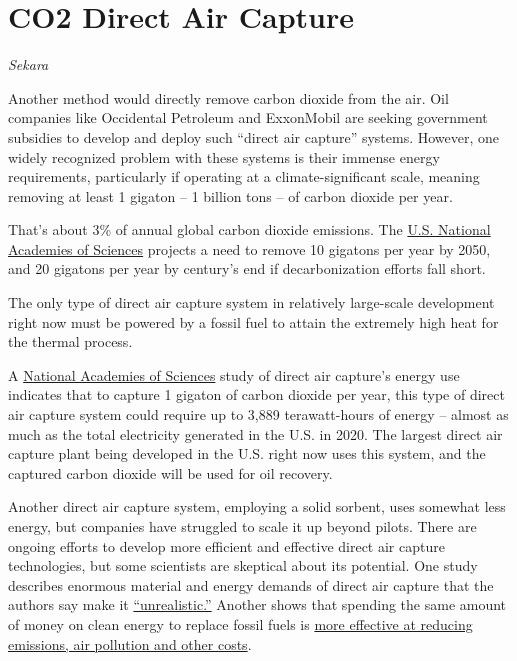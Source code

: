 \documentclass[
]{book}
\begin{document}
\hypertarget{co2-direct-air-capture}{%
\chapter{CO2 Direct Air Capture}\label{co2-direct-air-capture}}

\emph{Sekara}

Another method would directly remove carbon dioxide from the air. Oil companies like Occidental Petroleum and ExxonMobil are seeking government subsidies to develop and deploy such ``direct air capture'' systems. However, one widely recognized problem with these systems is their immense energy requirements, particularly if operating at a climate-significant scale, meaning removing at least 1 gigaton -- 1 billion tons -- of carbon dioxide per year.

That's about 3\% of annual global carbon dioxide emissions. The \href{https://www.nap.edu/catalog/25259/negative-emissions-technologies-and-reliable-sequestration-a-research-agenda}{U.S. National Academies of Sciences} projects a need to remove 10 gigatons per year by 2050, and 20 gigatons per year by century's end if decarbonization efforts fall short.

The only type of direct air capture system in relatively large-scale development right now must be powered by a fossil fuel to attain the extremely high heat for the thermal process.

A \href{https://www.nap.edu/catalog/25259/negative-emissions-technologies-and-reliable-sequestration-a-research-agenda}{National Academies of Sciences} study of direct air capture's energy use indicates that to capture 1 gigaton of carbon dioxide per year, this type of direct air capture system could require up to 3,889 terawatt-hours of energy -- almost as much as the total electricity generated in the U.S. in 2020. The largest direct air capture plant being developed in the U.S. right now uses this system, and the captured carbon dioxide will be used for oil recovery.

Another direct air capture system, employing a solid sorbent, uses somewhat less energy, but companies have struggled to scale it up beyond pilots. There are ongoing efforts to develop more efficient and effective direct air capture technologies, but some scientists are skeptical about its potential. One study describes enormous material and energy demands of direct air capture that the authors say make it \href{https://doi.org/10.1038/s41467-020-17203-7}{``unrealistic.''} Another shows that spending the same amount of money on clean energy to replace fossil fuels is \href{https://research.american.edu/carbonremoval/2019/11/13/jacobson-mark-2019-why-carbon-capture-and-direct-air-capture-cause-more-damage-than-good-to-climate-and-health/}{more effective at reducing emissions, air pollution and other costs}.
\end{document}
